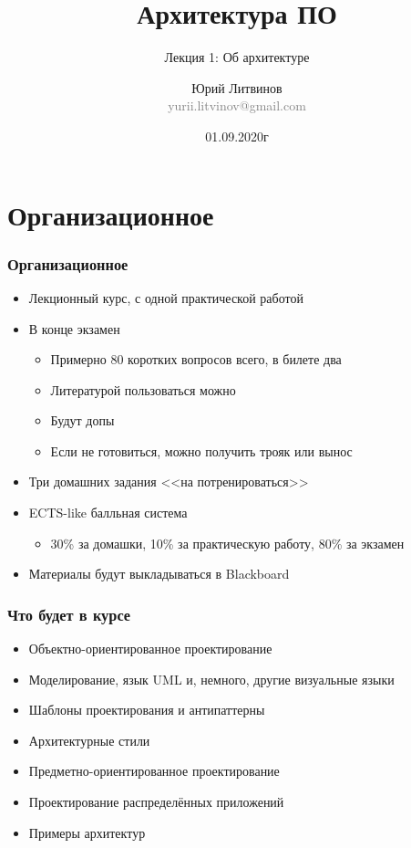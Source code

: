 \documentclass[xetex,mathserif,serif]{beamer}
\title{Архитектура ПО}
\subtitle{Лекция 1: Об архитектуре}
\author[Юрий Литвинов]{Юрий Литвинов\\\small{\textcolor{gray}{yurii.litvinov@gmail.com}}}
\date{01.09.2020г}
\begin{document}
    \frame{\titlepage}

    \section{Организационное}

    \begin{frame}
        \frametitle{Организационное}
        \begin{itemize}
            \item Лекционный курс, с одной практической работой
            \item В конце экзамен
            \begin{itemize}
                \item Примерно 80 коротких вопросов всего, в билете два
                \item Литературой пользоваться можно
                \item Будут допы
                \item Если не готовиться, можно получить трояк или вынос
            \end{itemize}
            \item Три домашних задания <<на потренироваться>>
            \item ECTS-like балльная система
            \begin{itemize}
                \item 30\% за домашки, 10\% за практическую работу, 80\% за экзамен
            \end{itemize}
            \item Материалы будут выкладываться в Blackboard
        \end{itemize}
    \end{frame}

    \begin{frame}
        \frametitle{Что будет в курсе}
        \begin{itemize}
            \item Объектно-ориентированное проектирование
            \item Моделирование, язык UML и, немного, другие визуальные языки
            \item Шаблоны проектирования и антипаттерны
            \item Архитектурные стили
            \item Предметно-ориентированное проектирование
            \item Проектирование распределённых приложений
            \item Примеры архитектур
        \end{itemize}
    \end{frame}
\end{document}
